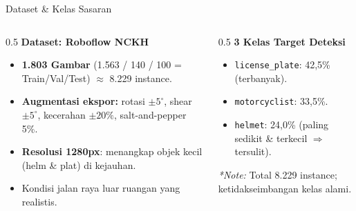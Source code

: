 \documentclass[aspectratio=169,10pt]{beamer}
\begin{document}
\begin{frame}{Dataset \& Kelas Sasaran}
\begin{columns}
\begin{column}{0.5\textwidth}
    \large\textbf{Dataset: Roboflow NCKH}
    \normalsize
    \vspace{0.5em}
    \begin{itemize}
        \item \textbf{1.803 Gambar} (1.563 / 140 / 100 = Train/Val/Test) $\approx$ 8.229 instance.
        \item \textbf{Augmentasi ekspor:} rotasi $\pm5^\circ$, shear $\pm5^\circ$, kecerahan $\pm20\%$, salt-and-pepper 5\%.
        \item \textbf{Resolusi 1280px}: menangkap objek kecil (helm \& plat) di kejauhan.
        \item Kondisi jalan raya luar ruangan yang realistis.
    \end{itemize}
\end{column}

\begin{column}{0.5\textwidth}
    \large\textbf{3 Kelas Target Deteksi}
    \normalsize
    \vspace{0.5em}
    \begin{itemize}
        \item \texttt{license\_plate}: 42,5\% (terbanyak).
        \item \texttt{motorcyclist}: 33,5\%.
        \item \texttt{helmet}: 24,0\% (paling sedikit \& terkecil $\Rightarrow$ tersulit).
    \end{itemize}
    \vspace{0.5em}
    \footnotesize \textit{*Note:} Total 8.229 instance; ketidakseimbangan kelas alami.
\end{column}
\end{columns}
\end{frame}
\end{document}
